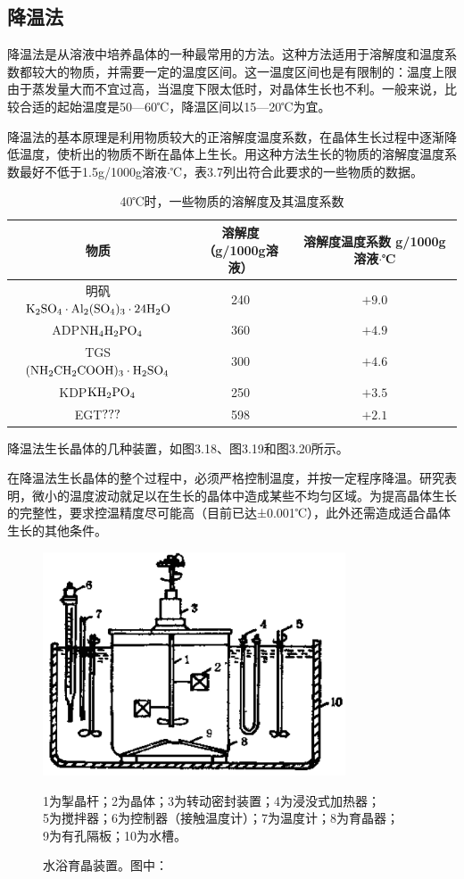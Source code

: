 ﻿\subsection{降温法}
降温法是从溶液中培养晶体的一种最常用的方法。这种方法适用于溶解度和温度系数都较大的物质，并需要一定的温度区间。这一温度区间也是有限制的：温度上限由于蒸发量大而不宜过高，当温度下限太低时，对晶体生长也不利。一般来说，比较合适的起始温度是50---60℃，降温区间以15---20℃为宜。

降温法的基本原理是利用物质较大的正溶解度温度系数，在晶体生长过程中逐渐降低温度，使析出的物质不断在晶体上生长。用这种方法生长的物质的溶解度温度系数最好不低于1.5g/1000g溶液$\cdot$℃，表3.7列出符合此要求的一些物质的数据。

\begin{table}[h]
\centering
\caption{40℃时，一些物质的溶解度及其温度系数}
\begin{tabular}{c|c|c}\toprule
物质 & \tabincell{c}{溶解度\\（g/1000g溶液）} & \tabincell{c}{溶解度温度系数\\g/1000g溶液$\cdot$℃}\\\hline
明矾\quad$\rm K_2SO_4\cdot Al_2(SO_4)_3\cdot 24H_2O$ & 240 & $+9.0$\\
ADP\quad$\rm NH_4H_2PO_4$ & 360 & $+4.9$\\
TGS\quad$\rm (NH_2CH_2COOH)_3\cdot H_2SO_4$ & 300 & $+4.6$\\
KDP\quad$\rm KH_2PO_4$ & 250 & $+3.5$\\
EGT\quad$\rm ???$ & 598 & $+2.1$\\
\bottomrule
\end{tabular}
\end{table}

降温法生长晶体的几种装置，如图3.18、图3.19和图3.20所示。

在降温法生长晶体的整个过程中，必须严格控制温度，并按一定程序降温。研究表明，微小的温度波动就足以在生长的晶体中造成某些不均匀区域。为提高晶体生长的完整性，要求控温精度尽可能高（目前已达±0.001℃），此外还需造成适合晶体生长的其他条件。

\begin{figure}[h]
 \centering
 \includegraphics[width=0.8\textwidth]{fig/cp03/img3.18.jpg}
 \caption{水浴育晶装置。图中：}
 1为掣晶杆；2为晶体；3为转动密封装置；4为浸没式加热器； \\
 5为搅拌器；6为控制器（接触温度计）；7为温度计；8为育晶器；\\
 9为有孔隔板；10为水槽。
\end{figure}

